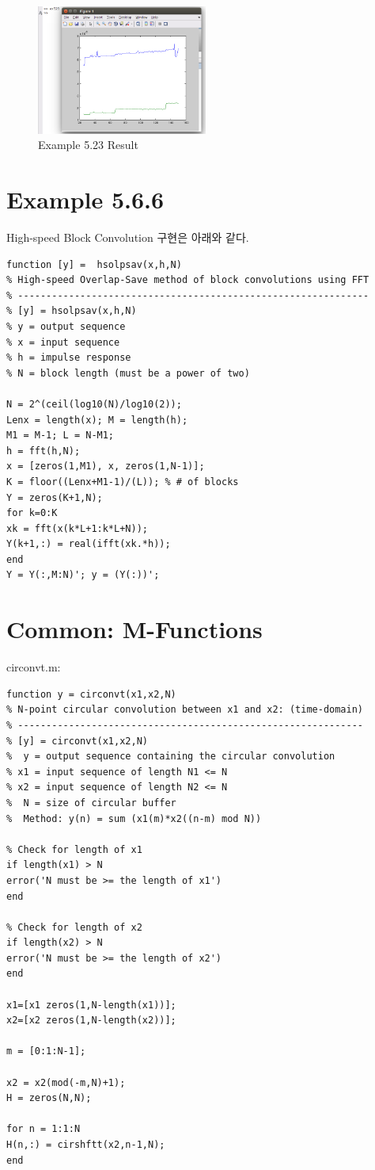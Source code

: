 \documentclass[11pt
  , a4paper
  , article
  , oneside
]{memoir}
\begin{document}
\begin{figure}[h!]
	\centering
	\includegraphics[width=0.5\textwidth,height=0.4\textwidth]{./images/ex523.png}
	\caption{Example 5.23 Result}
	\label{fig:Example 5.23 Result}
\end{figure}


\chapter{Example 5.6.6}
High-speed Block Convolution 구현은 아래와 같다.

\begin{lstlisting}[style=termstyle]
function [y] =  hsolpsav(x,h,N)
% High-speed Overlap-Save method of block convolutions using FFT
% --------------------------------------------------------------
% [y] = hsolpsav(x,h,N)
% y = output sequence
% x = input sequence
% h = impulse response
% N = block length (must be a power of two)

N = 2^(ceil(log10(N)/log10(2));
Lenx = length(x); M = length(h);
M1 = M-1; L = N-M1;
h = fft(h,N);
x = [zeros(1,M1), x, zeros(1,N-1)];
K = floor((Lenx+M1-1)/(L)); % # of blocks
Y = zeros(K+1,N);
for k=0:K
xk = fft(x(k*L+1:k*L+N));
Y(k+1,:) = real(ifft(xk.*h));
end
Y = Y(:,M:N)'; y = (Y(:))';
\end{lstlisting}

\chapter{Common: M-Functions}
circonvt.m:
\begin{lstlisting}[style=termstyle]
function y = circonvt(x1,x2,N)
% N-point circular convolution between x1 and x2: (time-domain)
% -------------------------------------------------------------
% [y] = circonvt(x1,x2,N)
%  y = output sequence containing the circular convolution
% x1 = input sequence of length N1 <= N
% x2 = input sequence of length N2 <= N
%  N = size of circular buffer
%  Method: y(n) = sum (x1(m)*x2((n-m) mod N))

% Check for length of x1
if length(x1) > N
error('N must be >= the length of x1')
end

% Check for length of x2
if length(x2) > N
error('N must be >= the length of x2')
end

x1=[x1 zeros(1,N-length(x1))];
x2=[x2 zeros(1,N-length(x2))];

m = [0:1:N-1];

x2 = x2(mod(-m,N)+1);
H = zeros(N,N);

for n = 1:1:N
H(n,:) = cirshftt(x2,n-1,N);
end
\end{lstlisting}
\end{document}
